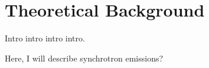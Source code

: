 \chapter{Theoretical Background}
\begin{chapabstract}

Intro intro intro intro.

\end{chapabstract}

Here, I will describe synchrotron emissions?
